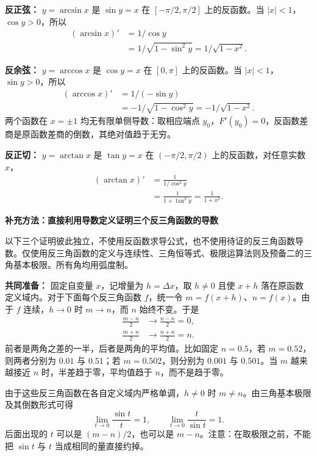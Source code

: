 \begin{proofbox}
\textbf{反正弦：} $y=\arcsin x$ 是 $\sin y=x$ 在 $[-\pi/2,\pi/2]$ 上的反函数。当 $|x|<1$，$\cos y>0$，所以
\[
\begin{aligned}
(\arcsin x)'&=1/\cos y\\
&=1/\sqrt{1-\sin^2y}=1/\sqrt{1-x^2}.
\end{aligned}
\]


\textbf{反余弦：} $y=\arccos x$ 是 $\cos y=x$ 在 $[0,\pi]$ 上的反函数。当 $|x|<1$，$\sin y>0$，所以
\[
\begin{aligned}
(\arccos x)'&=1/(-\sin y)\\
&=-1/\sqrt{1-\cos^2y}=-1/\sqrt{1-x^2}.
\end{aligned}
\]
两个函数在 $x=\pm1$ 均无有限单侧导数：取相应端点 $y_0$，$F'(y_0)=0$，反函数差商是原函数差商的倒数，其绝对值趋于无穷。



\textbf{反正切：} $y=\arctan x$ 是 $\tan y=x$ 在 $(-\pi/2,\pi/2)$ 上的反函数，对任意实数 $x$，
\[
\begin{aligned}
(\arctan x)'&=\frac1{1/\cos^2y}\\
&=\frac1{1+\tan^2y}=\frac1{1+x^2}.
\end{aligned}
\]

\medskip
\textbf{补充方法：直接利用导数定义证明三个反三角函数的导数}

以下三个证明彼此独立，不使用反函数求导公式，也不使用待证的反三角函数导数。仅使用反三角函数的定义与连续性、三角恒等式、极限运算法则及预备二的三角基本极限。所有角均用弧度制。

\textbf{共同准备：} 固定自变量 $x$，记增量为 $h=\Delta x$，取 $h\ne0$ 且使 $x+h$ 落在原函数定义域内。对于下面每个反三角函数 $f$，统一令 $m=f(x+h)$、$n=f(x)$。由于 $f$ 连续，$h\to0$ 时 $m\to n$，而 $n$ 始终不变。于是
\[
\begin{aligned}
\frac{m-n}{2}&\longrightarrow\frac{n-n}{2}=0,\\
\frac{m+n}{2}&\longrightarrow\frac{n+n}{2}=n.
\end{aligned}
\]
前者是两角之差的一半，后者是两角的平均值。比如固定 $n=0.5$，若 $m=0.52$，则两者分别为 $0.01$ 与 $0.51$；若 $m=0.502$，则分别为 $0.001$ 与 $0.501$。当 $m$ 越来越接近 $n$ 时，半差趋于零，平均值趋于 $n$，而不是趋于零。

由于这些反三角函数在各自定义域内严格单调，$h\ne0$ 时 $m\ne n$。由三角基本极限及其倒数形式可得
\[
\lim_{t\to0}\frac{\sin t}{t}=1,
\qquad
\lim_{t\to0}\frac{t}{\sin t}=1.
\]
后面出现的 $t$ 可以是 $(m-n)/2$，也可以是 $m-n$。注意：在取极限之前，不能把 $\sin t$ 与 $t$ 当成相同的量直接约掉。


\end{proofbox}
